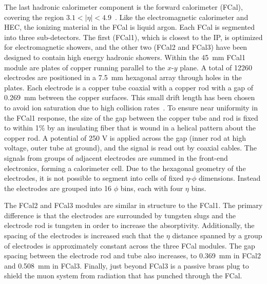 The last hadronic calorimeter component is the forward calorimeter
(FCal), covering the region $3.1 < |\eta| < 4.9$~\cite{bib:Aad:2008zzm}. Like the
electromagnetic calorimeter and HEC, the ionizing material in the FCal
is liquid argon. Each FCal is segmented into three sub-detectors. The
first (FCal1), which is closest to the IP, is optimized for electromagnetic
showers, and the other two (FCal2 and FCal3) have been designed to contain high energy
hadronic showers. Within the 45~mm FCal1 module are plates of copper
running parallel to the $x$-$y$ plane. A total of 12260 electrodes are
positioned in a 7.5~mm hexagonal array through holes in the plates. Each electrode is a copper
tube coaxial with a copper rod with a gap of 0.269~mm between the
copper surfaces. This small drift length has been chosen to
avoid ion saturation due to high collision
rates~\cite{bib:Artamonov:2008zz}. To ensure near uniformity in the
FCal1 response, the size of the gap between the copper tube and rod is
fixed to within 1\% by an insulating fiber that is wound in a helical
pattern about the copper rod. A potential of 250 V is applied across
the gap (inner rod at high voltage, outer tube at ground), and the
signal is read out by coaxial cables. The signals from groups of
adjacent electrodes are summed in the front-end electronics, forming a
calorimeter cell. Due to the hexagonal geometry of the electrodes, it
is not possible to segment into cells of fixed $\eta$-$\phi$
dimensions. Instead the electrodes are grouped into 16 $\phi$ bins,
each with four $\eta$ bins. 

The FCal2 and FCal3 modules are similar in structure to the FCal1. The
primary difference is that the electrodes are surrounded by tungsten
slugs and the electrode rod is tungsten in order to increase the
absorptivity. Additionally, the spacing of the electrodes is increased
such that the $\eta$ distance spanned by a group of electrodes is
approximately constant across the three FCal modules. The gap spacing
between the electrode rod and tube also increases, to 0.369~mm in
FCal2 and 0.508~mm in FCal3. Finally, just beyond FCal3 is a passive
brass plug to shield the muon system from radiation that has punched
through the FCal. 

